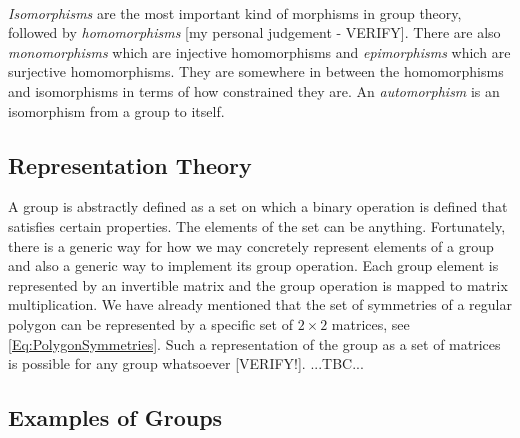 \paragraph{}
\emph{Isomorphisms} are the most important kind of morphisms in group theory, followed by \emph{homomorphisms} [my personal judgement - VERIFY]. There are also \emph{monomorphisms} which are injective homomorphisms and \emph{epimorphisms} which are surjective homomorphisms. They are somewhere in between the homomorphisms and isomorphisms in terms of how constrained they are. An \emph{automorphism} is an isomorphism from a group to itself.




\subsection{Representation Theory}
A group is abstractly defined as a set on which a binary operation is defined that satisfies certain properties. The elements of the set can be anything. Fortunately, there is a generic way for how we may concretely represent elements of a group and also a generic way to implement its group operation. Each group element is represented by an invertible matrix and the group operation is mapped to matrix multiplication. We have already mentioned that the set of symmetries of a regular polygon can be represented by a specific set of $2 \times 2$ matrices, see \ref{Eq:PolygonSymmetries}. Such a representation of the group as a set of matrices is possible for any group whatsoever [VERIFY!]. ...TBC...






\subsection{Examples of Groups}


